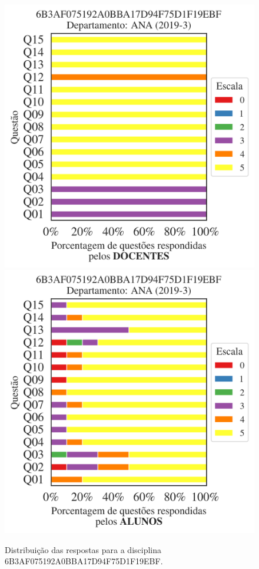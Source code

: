 \documentclass[a4paper,10pt]{article}
\begin{document}
\begin{figure}[h]
\centering
\includegraphics[width=0.485\linewidth]{analise_disciplina_departamento_ANA_6B3AF075192A0BBA17D94F75D1F19EBF_docentes.png}
\includegraphics[width=0.485\linewidth]{analise_disciplina_departamento_ANA_6B3AF075192A0BBA17D94F75D1F19EBF_alunos.png}
\caption{\label{fig:analise_geral_departamento}                Distribuição das respostas para a disciplina 6B3AF075192A0BBA17D94F75D1F19EBF. }
\end{figure}
\end{document}
